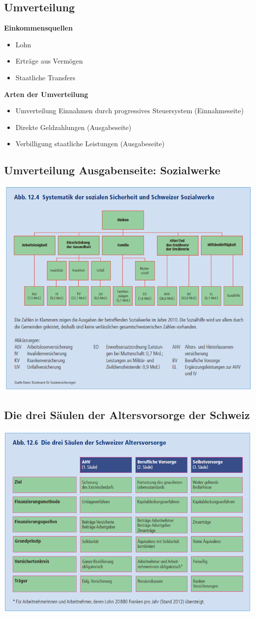 \subsection{Umverteilung} 
\begin{minipage}{5cm}
	\textbf{Einkommensquellen}
	\begin{itemize}
		\item Lohn
		\item Erträge aus Vermögen
		\item Staatliche Transfers
	\end{itemize}
\end{minipage}
\begin{minipage}{15cm}
	\textbf{Arten der Umverteilung}
	\begin{itemize}
		\item Umverteilung Einnahmen durch progressives Steuersystem (Einnahmeseite)
		\item Direkte Geldzahlungen (Ausgabeseite)
		\item Verbilligung staatliche Leistungen (Ausgabeseite)
	\end{itemize}
\end{minipage}
\clearpage
\pagebreak
\subsection{Umverteilung Ausgabenseite: Sozialwerke}
\includegraphics[width=0.8\linewidth]{images/sozialwerke.png}
\subsection{Die drei Säulen der Altersvorsorge der Schweiz}
\includegraphics[width=0.8\linewidth]{images/dreissaulen.png}
\clearpage
\pagebreak